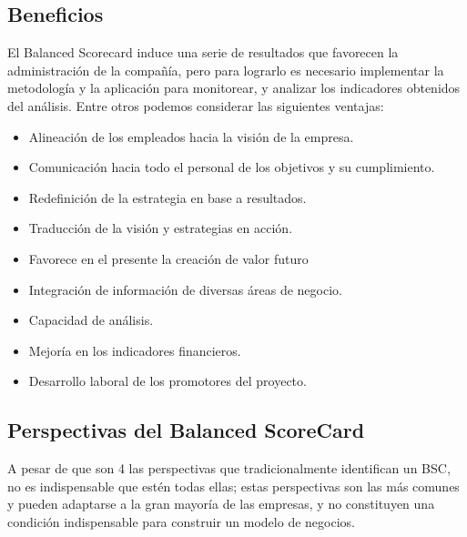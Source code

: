 \documentclass[10pt,a4paper]{article}
\begin{document}
			\subsection{Beneficios}
			
			El Balanced Scorecard induce una serie de resultados que favorecen la administración de la compañía, pero para lograrlo es necesario implementar la metodología y la aplicación para monitorear, y analizar los indicadores obtenidos del análisis. Entre otros podemos considerar las siguientes ventajas:
			
			\begin{itemize}
				\item Alineación de los empleados hacia la visión de la empresa.
				\item Comunicación hacia todo el personal de los objetivos y su cumplimiento.
				\item Redefinición de la estrategia en base a resultados.
				\item Traducción de la visión y estrategias en acción.
				\item Favorece en el presente la creación de valor futuro
				\item Integración de información de diversas áreas de negocio.
				\item Capacidad de análisis.
				\item Mejoría en los indicadores financieros.
				\item Desarrollo laboral de los promotores del proyecto.
			\end{itemize}
		
			\subsection{Perspectivas del Balanced ScoreCard}
			
			A pesar de que son 4 las perspectivas que tradicionalmente identifican un BSC, no es indispensable que estén todas ellas; estas perspectivas son las más comunes y pueden adaptarse a la gran mayoría de las empresas, y no constituyen una condición indispensable para construir un modelo de negocios.
			
			
\end{document}
